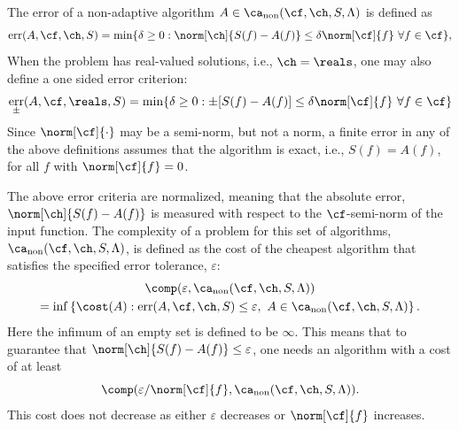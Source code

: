 \documentclass[]{elsarticle}
\DeclareMathOperator{\fix}{non}
\DeclareMathOperator{\err}{err}
\theoremstyle{definition}
\theoremstyle{remark}
\begin{document}
The error of a non-adaptive algorithm $A  \in \ca_{\fix}(\cf,\ch,S,\Lambda)$ is defined  as
\begin{equation} \label{errdefworst}
\err(A,\cf,\ch,S)
= \min\{ \delta \ge 0 : \norm[\ch]{S(f) -  A(f)} \le \delta \norm[\cf]{f} \ \forall f \in \cf \},
\end{equation}
When the problem has real-valued solutions, i.e., $\ch=\reals$, one may also define a one sided error criterion:
\begin{equation}\label{errpmdefworst}
\err_{\pm}(A,\cf,\reals,S) = 
\min \{ \delta \ge 0 : \pm[S(f) -  A(f)] \le \delta \norm[\cf]{f} \ \forall f \in \cf \} 
\end{equation}
Since $\norm[\cf]{\cdot}$ may be a semi-norm, but not a norm, a finite error in any of the above definitions assumes that the algorithm is exact, i.e., $S(f)=A(f)$, for all $f$ with $\norm[\cf]{f}=0$.

The above error criteria are normalized, meaning that the absolute error, $\norm[\ch]{S(f) -  A(f)}$ is measured with respect to the $\cf$-semi-norm of the input function. The complexity of a problem for this set of algorithms, $\ca_{\fix}(\cf,\ch,S,\Lambda)$, is defined as the cost of the cheapest algorithm that satisfies the specified error tolerance, $\varepsilon$:
\begin{multline} \label{fixcostcomplex}
\comp(\varepsilon,\ca_{\fix}(\cf,\ch,S,\Lambda)) \\
= \inf\left\{\cost(A) : \err(A,\cf,\ch,S) \le \varepsilon, \ A \in \ca_{\fix}(\cf,\ch,S,\Lambda) \right \}.
\end{multline}
Here the infimum of an empty set is defined to be $\infty$.  This means that to guarantee that $\norm[\ch]{S(f) -  A(f)} \le \varepsilon$, one needs an algorithm with a cost of at least 
\[
\comp(\varepsilon/\norm[\cf]{f},\ca_{\fix}(\cf,\ch,S,\Lambda)).
\]
This cost does not decrease as either $\varepsilon$ decreases or $\norm[\cf]{f}$ increases.
\end{document}
